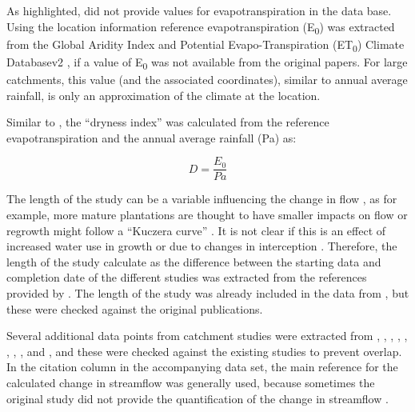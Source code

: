 \documentclass[]{elsarticle} %
\begin{document}
As highlighted, \citet{zhang2017} did not provide values for evapotranspiration in the data base. Using the location information reference evapotranspiration (E\textsubscript{0}) was extracted from the Global Aridity Index and Potential Evapo-Transpiration (ET\textsubscript{0}) Climate Databasev2 \citep{trabucco2018}, if a value of E\textsubscript{0} was not available from the original papers. For large catchments, this value (and the associated coordinates), similar to annual average rainfall, is only an approximation of the climate at the location.

Similar to \citet{zhang2017}, the ``dryness index'' was calculated from the reference evapotranspiration and the annual average rainfall (Pa) as:

\begin{equation}
D = \frac{E_{0}}{Pa} \label{eq:eq1}
\end{equation}

The length of the study can be a variable influencing the change in flow \citep[e.g.][]{jackson2005, filoso2017}, as for example, more mature plantations are thought to have smaller impacts on flow or regrowth might follow a ``Kuczera curve'' \citep{kuczera1987}. It is not clear if this is an effect of increased water use in growth \citep{vertessy2001} or due to changes in interception \citep{stoof2012}. Therefore, the length of the study calculate as the difference between the starting data and completion date of the different studies was extracted from the references provided by \citet{zhang2017}. The length of the study was already included in the data from \citet{filoso2017}, but these were checked against the original publications.

Several additional data points from catchment studies were extracted from \citet{almeida2016}, \citet{ferreto2020}, \citet{zhang2011}, \citet{zhao2010}, \citet{borg1988}, \citet{thornton2007}, \citet{zhou2010}, \citet{rodriguez2010}, \citet{ruprechtetal1991} and \citet{penaarancibia2012}, and these were checked against the existing studies to prevent overlap. In the citation column in the accompanying data set, the main reference for the calculated change in streamflow was generally used, because sometimes the original study did not provide the quantification of the change in streamflow \citep[i.e.~Table 6 in][]{zhang2011}.
\end{document}
